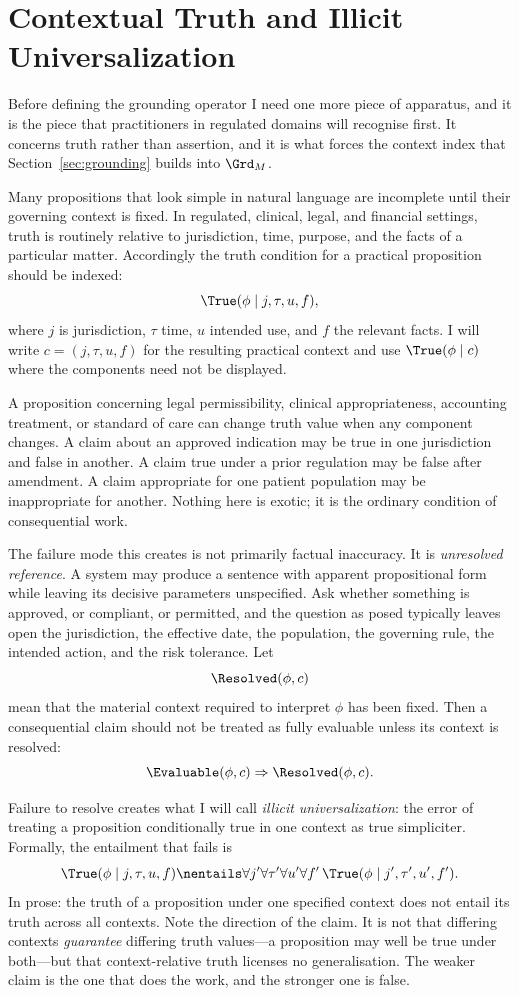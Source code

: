 \section{Contextual Truth and Illicit Universalization}
\label{sec:contextual-truth}

Before defining the grounding operator I need one more piece of apparatus, and
it is the piece that practitioners in regulated domains will recognise first. It
concerns truth rather than assertion, and it is what forces the context index
that Section~\ref{sec:grounding} builds into $\Grd_M$.

Many propositions that look simple in natural language are incomplete until
their governing context is fixed. In regulated, clinical, legal, and financial
settings, truth is routinely relative to jurisdiction, time, purpose, and the
facts of a particular matter. Accordingly the truth condition for a practical
proposition should be indexed:
\[
  \True(\phi \mid j, \tau, u, f),
\]
where $j$ is jurisdiction, $\tau$ time, $u$ intended use, and $f$ the relevant
facts. I will write $c = (j, \tau, u, f)$ for the resulting practical context and
use $\True(\phi \mid c)$ where the components need not be displayed.

A proposition concerning legal permissibility, clinical appropriateness,
accounting treatment, or standard of care can change truth value when any
component changes. A claim about an approved indication may be true in one
jurisdiction and false in another. A claim true under a prior regulation may be
false after amendment. A claim appropriate for one patient population may be
inappropriate for another. Nothing here is exotic; it is the ordinary condition
of consequential work.

The failure mode this creates is not primarily factual inaccuracy. It is
\emph{unresolved reference}. A system may produce a sentence with apparent
propositional form while leaving its decisive parameters unspecified. Ask whether
something is approved, or compliant, or permitted, and the question as posed
typically leaves open the jurisdiction, the effective date, the population, the
governing rule, the intended action, and the risk tolerance. Let
\[
  \Resolved(\phi, c)
\]
mean that the material context required to interpret $\phi$ has been fixed. Then
a consequential claim should not be treated as fully evaluable unless its context
is resolved:
\[
  \Evaluable(\phi, c) \Rightarrow \Resolved(\phi, c).
\]

Failure to resolve creates what I will call \emph{illicit universalization}: the
error of treating a proposition conditionally true in one context as true
simpliciter. Formally, the entailment that fails is
\[
  \True(\phi \mid j, \tau, u, f)
  \nentails
  \forall j' \forall \tau' \forall u' \forall f'\,
  \True(\phi \mid j', \tau', u', f').
\]
In prose: the truth of a proposition under one specified context does not entail
its truth across all contexts. Note the direction of the claim. It is not that
differing contexts \emph{guarantee} differing truth values---a proposition may
well be true under both---but that context-relative truth licenses no
generalisation. The weaker claim is the one that does the work, and the stronger
one is false.

